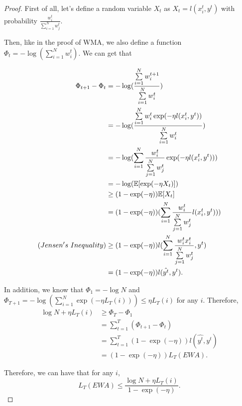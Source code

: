 \documentclass[../main.tex]{subfiles}
\begin{document}
\begin{proof}
	First of all, let's define a random variable $X_t$ as $X_t = l(x_i^t,y^t)$ with probability $\frac{w_i^t}{\sum\limits_{i = 1}^N w_j^t}$.
	
	Then, like in the proof of WMA, we also define a function $\Phi_t = -\log(\sum\limits_{i = 1}^N w_i^t)$. We can get that
	
	\begin{equation*}
		\begin{aligned}
			\Phi_{t+1} - \Phi_t & = -\log(\frac{\sum\limits_{i = 1}^N w_i^{t+1}}{\sum\limits_{i = 1}^N w_i^t}) \\
			& = -\log(\frac{\sum\limits_{i = 1}^N w_i^{t} \exp(-\eta l(x_i^t,y^t))}{\sum\limits_{i = 1}^N w_i^t}) \\
			& = -\log( \sum\limits_{i = 1}^N \frac{w_i^{t}}{\sum\limits_{j = 1}^N w_j^t} \exp(-\eta l(x_i^t,y^t))) \\
			& = -\log (\mathbb{E}[\exp(-\eta X_t)]) \\
			& \geq (1 - \exp(-\eta)) \mathbb{E}[X_t] \\
			& = (1 - \exp(-\eta)) ( \sum\limits_{i = 1}^N \frac{w_i^{t}}{\sum\limits_{j = 1}^N w_j^t} l(x_i^t,y^t))) \\
		(Jensen's\ Inequality)	& \geq  (1 - \exp(-\eta)) l(\sum\limits_{i = 1}^N \frac{w_i^{t} x_i^t}{\sum\limits_{j = 1}^N w_j^t},y^t) \\
		& =  (1 - \exp(-\eta)) l(\hat{y^t}, y^t).
		\end{aligned}
	\end{equation*}
	
	In addition, we know that $\Phi_1 = -\log N$ and $\Phi_{T+1} = -\log(\sum\limits_{i = 1}^N \exp(-\eta L_T(i))) \leq \eta L_T(i) $ for any $i$. Therefore,
	\begin{equation*}
	\begin{aligned}
	\log N + \eta L_T(i) & \geq  \Phi_{T} - \Phi_1 \\
	 & = \sum\limits_{t = 1}^T (\Phi_{t+1} - \Phi_{t})  \\
	 & =  \sum\limits_{t = 1}^T (1 - \exp(-\eta)) l(\hat{y^t}, y^t) \\
	 & =  (1 - \exp(-\eta)) L_T(EWA).
	\end{aligned}
	\end{equation*}
	
	Therefore, we can have that for any $i$,
	\begin{equation*}
	L_T(EWA) \leq \frac{\log N + \eta L_T(i)}{1 - \exp(-\eta)}.
	\end{equation*}
\end{proof}
\end{document}

